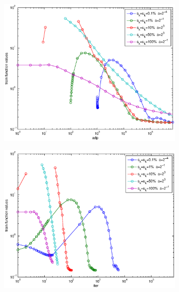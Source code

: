 \documentclass[12pt]{article}
\begin{document}
\begin{figure}[H]
\begin{subfigure}[b]{.5\linewidth}
	        \includegraphics[width=4in]{Figures/exp1.eps}
\end{subfigure}%
\begin{subfigure}[b]{.5\linewidth}
	        \includegraphics[width=4in]{Figures/exp2.eps}
\end{subfigure}%


\end{figure}
\end{document}

